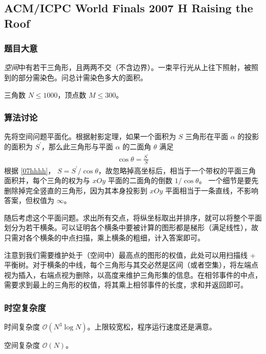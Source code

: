 			
		\newpage
					
	
		\subsection{ACM/ICPC World Finals 2007 H Raising the Roof}
			\subsubsection{题目大意}
				\emph{空间}中有若干三角形，且两两不交（不含边界）。一束平行光从上往下照射，被照到的部分需染色。问总计需染色多大的面积。
				
				三角数 $N \le 1000$，顶点数 $M \le 300$。
			\subsubsection{算法讨论}
				先将空间问题平面化。根据射影定理，如果一个面积为  $S$ 三角形在平面 $\alpha$ 的投影的面积为 $S^\prime$，那么此三角形与平面 $\alpha$ 的二面角 $\theta$ 满足
				\begin{align}
					\cos \theta = \frac{S^\prime}{S} \label{07hhhh}
				\end{align}
				根据 \eqref{07hhhh}， $S = S^\prime / \cos \theta$，故忽略掉高坐标后，相当于一个带权的平面三角面积并，每个三角的权为与 $xOy$ 平面的二面角的倒数  $1/ \cos \theta$。 一个细节是要先删除掉完全竖直的三角形，因为其本身投影到 $xOy$ 平面相当于一条直线，不影响答案，但权值为 $\infty$。
				
				随后考虑这个平面问题。求出所有交点，将纵坐标取出并排序，就可以将整个平面划分为若干横条。可以证明各个横条中要被计算的图形都是梯形（满足线性），故只需对各个横条的中点扫描，乘上横条的粗细，计入答案即可。
				
				注意到我们需要维护处于（空间中）最高点的图形的权值，此处可以用扫描线 + 平衡树。对于横条的中线，每个三角形与其交必然是区间（或者空集），将左端点视为插入，右端点视为删除，以高度来维护三角形集的信息。在相邻事件的中点，需要求到最上的三角形的权值，将其乘上相邻事件的长度，求和并返回即可。
					
			\subsubsection{时空复杂度}
				时间复杂度 $\mathcal{O}\left(N^3\log N\right)$。上限较宽松，程序运行速度还是满意。
					
				空间复杂度 $\mathcal{O}\left(N\right)$。
				
			
			
		\newpage
					
